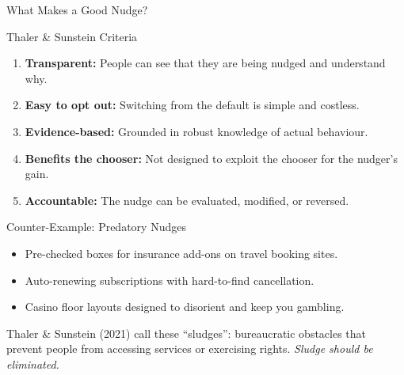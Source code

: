 \documentclass[aspectratio=169]{beamer}
\begin{document}
\begin{frame}{What Makes a Good Nudge?}
\begin{block}{Thaler \& Sunstein Criteria}
\begin{enumerate}[<+->]
  \item \textbf{Transparent:} People can see that they are being nudged and understand why.
  \item \textbf{Easy to opt out:} Switching from the default is simple and costless.
  \item \textbf{Evidence-based:} Grounded in robust knowledge of actual behaviour.
  \item \textbf{Benefits the chooser:} Not designed to exploit the chooser for the nudger's gain.
  \item \textbf{Accountable:} The nudge can be evaluated, modified, or reversed.
\end{enumerate}
\end{block}
\begin{alertblock}{Counter-Example: Predatory Nudges}
\begin{itemize}
  \item Pre-checked boxes for insurance add-ons on travel booking sites.
  \item Auto-renewing subscriptions with hard-to-find cancellation.
  \item Casino floor layouts designed to disorient and keep you gambling.
\end{itemize}
Thaler \& Sunstein (2021) call these \alert{``sludges''}: bureaucratic obstacles that prevent people from accessing services or exercising rights. \textit{Sludge should be eliminated.}
\end{alertblock}
\end{frame}
\end{document}
